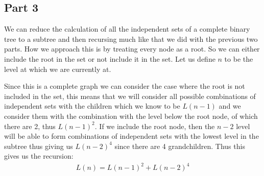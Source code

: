 \documentclass[11pt]{article}
\begin{document}
\subsection*{Part 3}
We can reduce the calculation of all the independent sets of a complete binary tree to a subtree and then recursing much like that we did with the previous two parts. How we approach this is by treating every node as a root. So we can either include the root in the set or not include it in the set. Let us define $n$ to be the level at which we are currently at. 
\begin{center}
\end{center}
Since this is a complete graph we can consider the case where the root is not included in the set, this means that we will consider all possible combinations of independent sets with the children which we know to be $L(n-1)$ and we consider them with the combination with the level below the root node, of which there are 2, thus $L(n-1)^2$. If we include the root node, then the $n-2$ level will be able to form combinations of independent sets with the lowest level in the subtree thus giving us $L(n-2)^4$ since there are 4 grandchildren. Thus this gives us the recursion:
\begin{align*}
L(n) = L(n-1)^2 + L(n-2)^4
\end{align*}
\begin{align*}
\end{align*}
\end{document}
